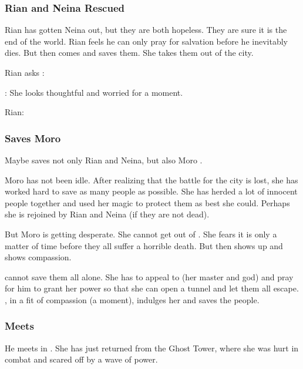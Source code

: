 \subsubsection{Rian and Neina Rescued}
Rian has gotten Neina out, but they are both hopeless.
They are sure it is the end of the world.
Rian feels he can only pray for salvation before he inevitably dies. 
But then \Criseis comes and saves them. 
She takes them out of the city.

Rian asks \Criseis: 

\Criseis: 
She looks thoughtful and worried for a moment.

Rian: 






\subsubsection{Saves Moro}
Maybe \Criseis saves not only Rian and Neina, but also Moro \Cobrel.

Moro has not been idle.
After realizing that the battle for the city is lost, she has worked hard to save as many people as possible. 
She has herded a lot of innocent people together and used her magic to protect them as best she could. 
Perhaps she is rejoined by Rian and Neina (if they are not dead).

But Moro is getting desperate.
She cannot get out of \Malcur. 
She fears it is only a matter of time before they all suffer a horrible death. 
But then \Criseis shows up and shows compassion. 

\Criseis cannot save them all alone.
She has to appeal to \Ishnaruchaefir (her master and god) and pray for him to grant her power so that she can open a tunnel and let them all escape. 
\Ishnaruchaefir, in a fit of compassion (a  moment), indulges her and saves the people. 





\subsubsection{Meets \Nzessuacrith}
He meets \Nzessuacrith{} in \Malcur. 
She has just returned from the Ghost Tower, where she was hurt in combat and scared off by a wave of \sathariah{} power. 

